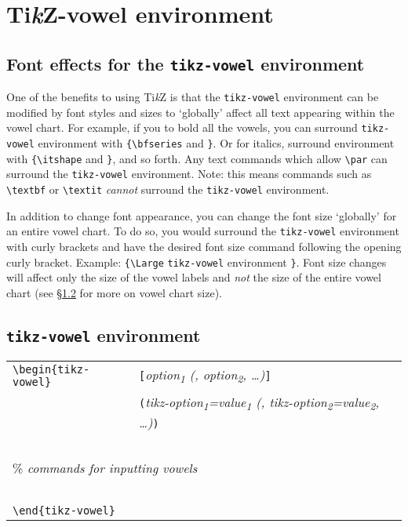 \documentclass{article}
\newcommand{\TikZ}{Ti\textit{k}Z\xspace}
\newcommand{\pkg}[1]{\texttt{#1}}
\begin{document}
\section{\TikZ-vowel environment}
\label{sec:TikZ-vowel environment}

\subsection{Font effects for the \texttt{tikz-vowel} environment}
\label{sec:Font effects for the tikz-vowel environment}

One of the benefits to using \TikZ is that the \verb|tikz-vowel| environment can be modified by font styles and sizes to `globally' affect all text appearing within the vowel chart.  For example, if you to bold all the vowels, you can surround \verb|tikz-vowel| environment with \verb|{\bfseries| and \verb|}|.  Or for italics, surround \verb|| environment with \verb|{\itshape| and \verb|}|, and so forth.  Any text commands which allow \verb|\par| can surround the \verb|tikz-vowel| environment.  {\color{red}Note: this means commands such as \verb|\textbf| or \verb|\textit| {\large\textit{cannot}} surround the \verb|tikz-vowel| environment.}

In addition to change font appearance, you can change the font size `globally' for an entire vowel chart.  To do so, you would surround the \verb|tikz-vowel| environment with curly brackets and have the desired font size command following the opening curly bracket.  Example: \verb|{\Large| \verb|tikz-vowel| environment \verb|}|.  Font size changes will affect only the size of the vowel labels and \textit{not} the size of the entire vowel chart (see \S \ref{sec:tikz-vowel environment} for more on vowel chart size). 


\subsection{\pkg{tikz-vowel} environment}
\label{sec:tikz-vowel environment}

\medskip

\begin{center}
\begin{tabular}{ll}
\verb|\begin{tikz-vowel}| & \verb|[|\textit{option\textsubscript{1} (, option\textsubscript{2}, \dots)}\verb|]| \\
~ & \verb|(|\textit{tikz-option\textsubscript{1}=value\textsubscript{1} (, tikz-option\textsubscript{2}=value\textsubscript{2}, \dots)}\verb|)| \\
~ & ~ \\
\multicolumn{2}{l}{\qquad \% \textit{commands for inputting vowels}} \\
~ & ~ \\
\verb|\end{tikz-vowel}| & 
\end{tabular}
\end{center}
\end{document}
